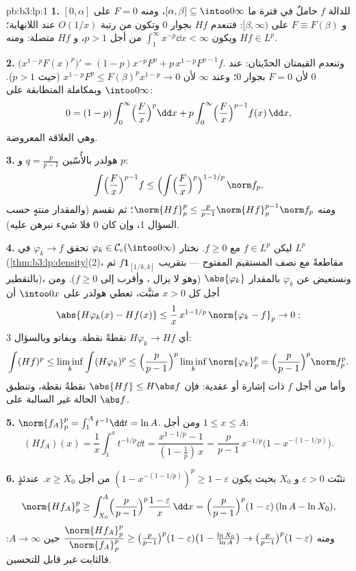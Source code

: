 \begin{solution}{pb:b3:lp:1}
\textbf{1.} للدالة $f$ حاملٌ في فترة ما $[\alpha, \beta]
\subseteq \intoo0\infty$، ومنه $F = 0$
على $[0, \alpha]$ و $F
\equiv F(\beta)$ على $[\beta, \infty)$: فتنعدم $Hf$ بجوار $0$
وتكون من رتبة $O(1/x)$ عند اللانهاية؛ ويكون $\int_1^\infty x^{-p}\dd x <
\infty$ من أجل
$p > 1$، و $Hf$ متصلة: ومنه $Hf \in L^p$.

\textbf{2.} $\bigl(x^{1-p}F(x)^p\bigr)' = (1-p)x^{-p}F^p +
p\,x^{1-p}F^{p-1}f$. وتنعدم القيمتان الحدّيتان: عند $0$ لأن
$F = 0$ بجوار $0$؛ وعند $\infty$ لأن $x^{1-p}F^p \leq
F(\beta)^p x^{1-p} \to 0$ (حيث $p > 1$).
وبمكاملة المتطابقة على $\intoo0\infty$:
\[
0 = (1 - p)\int_0^\infty\Bigl(\frac Fx\Bigr)^p\dd x
+ p\int_0^\infty\Bigl(\frac Fx\Bigr)^{p-1}f(x)\,\dd x,
\]
وهي العلاقة المعروضة.

\textbf{3.} هولدر بالأُسّين $q = \frac p{p-1}$ و $p$:
\[
\int\Bigl(\frac Fx\Bigr)^{p-1}f
\leq \Bigl(\int\Bigl(\frac
Fx\Bigr)^{p}\Bigr)^{1 - 1/p}\,\norm f_p ,
\]
ومنه $\norm{Hf}_p^p \leq \frac p{p-1}\norm{Hf}_p^{p-1}\norm
f_p$؛ ثم نقسم (والمقدار منتهٍ حسب السؤال 1، وإن كان $0$
فلا شيء نبرهن عليه).

\textbf{4.} ليكن $f \in L^p$ مع $f \geq 0$. نختار $\varphi_k \in
\mathcal C_c(\intoo0\infty)$ تحقق
$\varphi_k \to f$ في $L^p$ (\cref{thm:b3:lp:density}(2)، مقاطعةً مع نصف المستقيم
المفتوح --- بتقريب $f\mathbf 1_{[1/k, k]}$ ثم بالتقطير)، ونستعيض عن $\varphi_k$
بالمقدار $\abs{\varphi_k}$ (وهو لا يزال ، وأقرب إلى $f \geq 0$).
ومن أجل كل $x > 0$ مثبَّت، تعطي هولدر على $\intoo0x$ أن
\[
\abs{H\varphi_k(x) - Hf(x)} \leq
\frac1x\,x^{1 - 1/p}\,\norm{\varphi_k - f}_p \to 0 :
\]
أي $H\varphi_k \to Hf$ نقطةً نقطة. وبفاتو وبالسؤال 3:
\[
\int (Hf)^p \leq \liminf_k\int(H\varphi_k)^p
\leq \Bigl(\frac p{p-1}\Bigr)^p\liminf_k\norm{\varphi_k}_p^p
= \Bigl(\frac p{p-1}\Bigr)^p\norm f_p^p .
\]
وأما من أجل $f$ ذات إشارة أو عقدية: فإن $\abs{Hf} \leq H\abs f$ نقطةً نقطة،
وتنطبق الحالة غير السالبة على $\abs f$.

\textbf{5.} $\norm{f_A}_p^p = \int_1^A t^{-1}\dd t = \ln A$. ومن أجل $1 \leq x \leq A$:
\[
(Hf_A)(x) = \frac1x\int_1^x t^{-1/p}\dd t
= \frac{x^{1 - 1/p} - 1}{(1 - \tfrac1p)\,x}
= \frac p{p-1}\,x^{-1/p}\bigl(1 - x^{-(1 - 1/p)}\bigr).
\]

\textbf{6.} نثبّت $\varepsilon > 0$ و $X_0$ بحيث يكون $(1 -
x^{-(1-1/p)})^p \geq 1 - \varepsilon$ من أجل
$x \geq X_0$. عندئذٍ
\[
\norm{Hf_A}_p^p \geq \int_{X_0}^A\Bigl(\frac
p{p-1}\Bigr)^p\frac{1 - \varepsilon}{x}\,\dd x
= \Bigl(\frac p{p-1}\Bigr)^p(1 - \varepsilon)\,(\ln A - \ln
X_0),
\]
ومنه $\dfrac{\norm{Hf_A}_p^p}{\norm{f_A}_p^p} \geq \bigl(\frac
p{p-1}\bigr)^p(1 - \varepsilon)\bigl(1 - \frac{\ln X_0}{\ln
A}\bigr) \to \bigl(\frac p{p-1}\bigr)^p(1 - \varepsilon)$ حين $A \to \infty$: فالثابت غير قابل للتحسين.


\end{solution}
